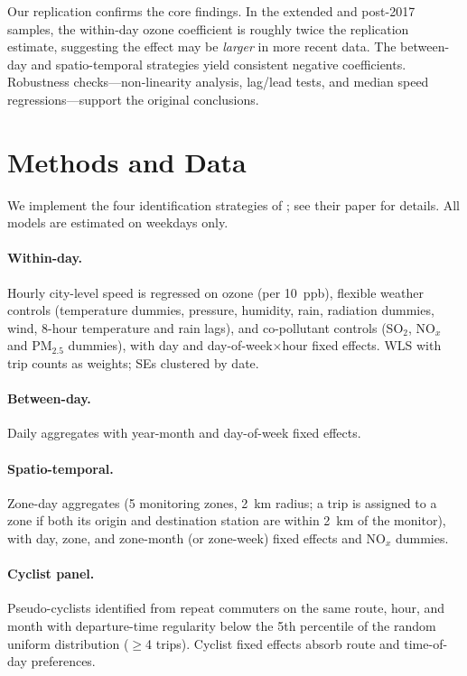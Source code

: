 \documentclass[12pt]{article}
\begin{document}
Our replication confirms the core findings. In the extended and post-2017 samples, the within-day ozone coefficient is roughly twice the replication estimate, suggesting the effect may be \emph{larger} in more recent data. The between-day and spatio-temporal strategies yield consistent negative coefficients. Robustness checks---non-linearity analysis, lag/lead tests, and median speed regressions---support the original conclusions.


\section{Methods and Data} \label{sec:methods}

We implement the four identification strategies of \citet{klingen2020urban}; see their paper for details. All models are estimated on weekdays only.

\paragraph{Within-day.} Hourly city-level speed is regressed on ozone (per 10~ppb), flexible weather controls (temperature dummies, pressure, humidity, rain, radiation dummies, wind, 8-hour temperature and rain lags), and co-pollutant controls (SO$_2$, NO$_x$ and PM$_{2.5}$ dummies), with day and day-of-week$\times$hour fixed effects. WLS with trip counts as weights; SEs clustered by date.

\paragraph{Between-day.} Daily aggregates with year-month and day-of-week fixed effects.

\paragraph{Spatio-temporal.} Zone-day aggregates (5 monitoring zones, 2~km radius; a trip is assigned to a zone if both its origin and destination station are within 2~km of the monitor), with day, zone, and zone-month (or zone-week) fixed effects and NO$_x$ dummies.

\paragraph{Cyclist panel.} Pseudo-cyclists identified from repeat commuters on the same route, hour, and month with departure-time regularity below the 5th percentile of the random uniform distribution ($\geq$4 trips). Cyclist fixed effects absorb route and time-of-day preferences.
\end{document}

